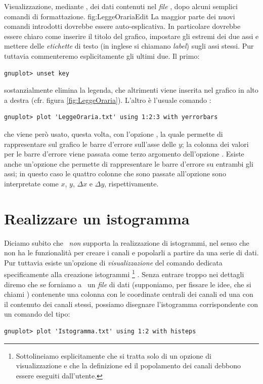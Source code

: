 {Visualizzazione, mediante \gnuplot, dei dati contenuti nel \emph{file}
, dopo alcuni semplici comandi di formattazione.}
{fig:LeggeOrariaEdit}
La maggior parte dei nuovi comandi introdotti dovrebbe essere auto-esplicativa.
In particolare dovrebbe essere chiaro come inserire il titolo del grafico,
impostare gli estremi dei due assi e mettere delle \emph{etichette} di testo
(in inglese si chiamano \emph{label}) sugli assi stessi.
Pur tuttavia commenteremo esplicitamente gli ultimi due. Il primo:
\begin{verbatim}
gnuplot> unset key
\end{verbatim}
sostanzialmente elimina la legenda, che altrimenti viene inserita nel grafico
in alto a destra (cfr. figura \ref{fig:LeggeOraria}). L'altro \`e l'usuale
comando :
\begin{verbatim}
gnuplot> plot 'LeggeOraria.txt' using 1:2:3 with yerrorbars
\end{verbatim}
che viene per\`o usato, questa volta, con l'opzione ,
la quale permette di rappresentare sul grafico le barre d'errore sull'asse
delle $y$; la colonna dei valori per le barre d'errore viene passata come
terzo argomento dell'opzione .
Esiste anche un'opzione  che permette di rappresentare
le barre d'errore su entrambi gli assi; in questo caso le quattro colonne che
sono passate all'opzione  sono interpretate come $x$, $y$,
$\Delta x$ e $\Delta y$, rispettivamente.



\section{Realizzare un istogramma}

Diciamo subito che \gnuplot\ \emph{non} supporta la realizzazione di
istogrammi, nel senso che non ha le funzionalit\`a per creare i canali e
popolarli a partire da una serie di dati.
Pur tuttavia esiste un'opzione di \emph{visualizzazione} del comando
 dedicata specificamente alla creazione istogrammi%
\footnote{
Sottolineiamo esplicitamente che si tratta solo di un opzione di
visualizzazione e che la definizione ed il popolamento dei canali debbono
essere eseguiti dall'utente.
}%
.
Senza entrare troppo nei dettagli diremo che se forniamo a \gnuplot\ un
\emph{file} di dati (supponiamo, per fissare le idee, che si chiami
) contenente una colonna con le coordinate
centrali dei canali ed una con il contenuto dei canali stessi, possiamo
disegnare l'istogramma corrispondente con un comando del tipo:
\begin{verbatim}
gnuplot> plot 'Istogramma.txt' using 1:2 with histeps
\end{verbatim}



